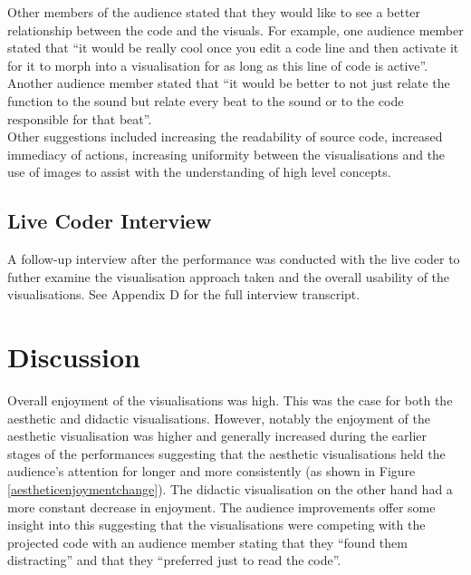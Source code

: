 \documentclass[12pt]{article}
\begin{document}
Other members of the audience stated that they would like to see a better relationship between the code and the visuals. For example, one audience member stated that ``it would be really cool once you edit a code line and then activate it for it to morph into a visualisation for as long as this line of code is active''. Another audience member stated that ``it would be better to not just relate the function to the sound but relate every beat to the sound or to the code responsible for that beat''.\\

Other suggestions included increasing the readability of source code, increased immediacy of actions, increasing uniformity between the visualisations and the use of images to assist with the understanding of high level concepts.\\

\subsection{Live Coder Interview}

A follow-up interview after the performance was conducted with the live coder to futher examine the visualisation approach taken and the overall usability of the visualisations. See Appendix D for the full interview transcript.

\section{Discussion}

Overall enjoyment of the visualisations was high. This was the case for both the aesthetic and didactic visualisations. However, notably the enjoyment of the aesthetic visualisation was higher and generally increased during the earlier stages of the performances suggesting that the aesthetic visualisations held the audience's attention for longer and more consistently (as shown in Figure \ref{aestheticenjoymentchange}). The didactic visualisation on the other hand had a more constant decrease in enjoyment. The audience improvements offer some insight into this suggesting that the visualisations were competing with the projected code with an audience member stating that they ``found them distracting'' and that they ``preferred just to read the code''.\\
\end{document}
